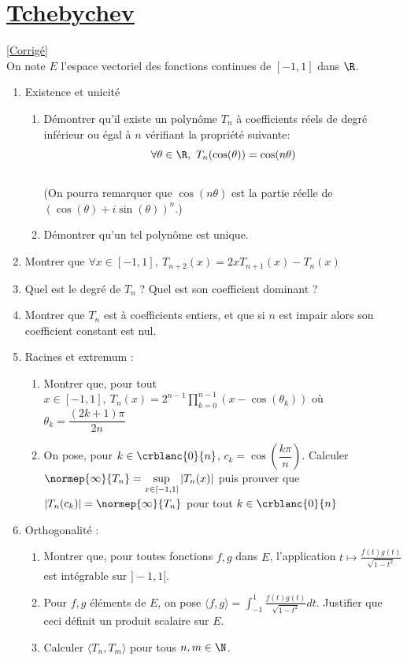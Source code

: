 \documentclass{book}
\begin{document}
	\section{\underline{Tchebychev} }
	\textcolor{blue}{\hyperref[sec:Tchebychev]{[Corrigé]}}\\
	\label{Tchebychev}
	On note $E$ l'espace vectoriel des fonctions continues de $[-1,1]$ dans $\R$.
	\begin{enumerate}[leftmargin=*]
		\item Existence et unicité
		\begin{enumerate}[label=\alph*.]
			\item Démontrer qu'il existe un polynôme $T_n$ à coefficients réels de degré inférieur ou égal à $n$ vérifiant la propriété suivante:
			$$ \forall \theta\in\R,\ T_n(\cos(\theta))=\cos(n\theta)$$
			\\(On pourra remarquer que $\cos(n\theta)$ est la partie réelle de $(\cos(\theta)+i\sin(\theta))^n$.) 
			\item Démontrer qu'un tel polynôme est unique.
		\end{enumerate}
		\item Montrer que $\forall x\in[-1,1],\ T_{n+2}(x)=2xT_{n+1}(x)-T_n(x)$
		\item Quel est le degré de $T_n$ ? Quel est son coefficient dominant ?
		\item Montrer que $T_n$ est à coefficients entiers, et que si $n$ est impair alors son coefficient constant est nul.
		\item Racines et extremum :
		\begin{enumerate}[label=\alph*.]
			\item Montrer que, pour tout $x\in[-1,1], \ T_n(x)=2^{n-1}\displaystyle\prod_{k=0}^{n-1}(x-\cos(\theta_k))$ où $\theta_k=\dfrac{(2k+1)\pi}{2n}$
			\item On pose, pour $k\in\crblanc{0}{n}$, $c_k=\cos\left(\dfrac{k\pi}{n}\right)$. Calculer $\normep{\infty}{T_n}=\sup\limits_{x\in[-1,1]}|T_n(x)|$ puis prouver que $|T_n(c_k)|=\normep{\infty}{T_n}$ pour tout $k\in\crblanc{0}{n}$
		\end{enumerate}
		\item Orthogonalité :
		\begin{enumerate}[label=\alph*.]
			\item Montrer que, pour toutes fonctions $f,g$ dans $E$, l'application $t\mapsto \displaystyle\frac{f(t)g(t)}{\sqrt{1-t^2}}$ est intégrable sur $]-1,1[$.
			\item Pour $f,g$ éléments de $E$, on pose $\langle f,g \rangle =\displaystyle\int_{-1}^1\frac{f(t)g(t)}{\sqrt{1-t^2}} dt$. Justifier que ceci définit un produit scalaire sur $E$.
			\item Calculer $\langle T_n,T_m \rangle$ pour tous $n,m\in \N$. 
		\end{enumerate}
	\end{enumerate}
	
\end{document}
